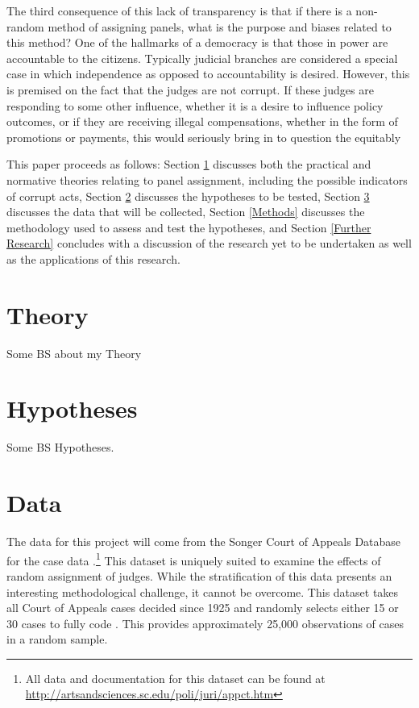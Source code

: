 \documentclass[12pt]{article}
\begin{document}
The third consequence of this lack of transparency is that if there is a non-random method of assigning panels, what is the purpose and biases related to this method?  One of the hallmarks of a democracy is that those in power are accountable to the citizens.  Typically judicial branches are considered a special case in which independence as opposed to accountability is desired.  However, this is premised on the fact that the judges are not corrupt.  If these judges are responding to some other influence, whether it is a desire to influence policy outcomes, or if they are receiving illegal compensations, whether in the form of promotions or payments, this would seriously bring in to question the equitably 

This paper proceeds as follows: Section \ref{Theory} discusses both the practical and normative theories relating to panel assignment, including the possible indicators of corrupt acts, Section \ref{Hypotheses} discusses the hypotheses to be tested, Section \ref{Data} discusses the data that will be collected, Section \ref{Methods} discusses the methodology used to assess and test the hypotheses, and Section \ref{Further Research} concludes with a discussion of the research yet to be undertaken as well as the applications of this research.

\section{Theory}\label{Theory}
Some BS about my Theory

\section{Hypotheses}\label{Hypotheses}
Some BS Hypotheses.

\section{Data}\label{Data}
The data for this project will come from the Songer Court of Appeals Database for the case data \citep{Songer2007}.\footnote{All data and documentation for this dataset can be found at \url{http://artsandsciences.sc.edu/poli/juri/appct.htm}}  This dataset is uniquely suited to examine the effects of random assignment of judges.  While the stratification of this data presents an interesting methodological challenge, it cannot be overcome.  This dataset takes all Court of Appeals cases decided since 1925 and randomly selects either 15 or 30 cases to fully code \citep{hurwitz2006institutional,hurtwitz2012changes}.  This provides approximately 25,000 observations of cases in a random sample.   
\end{document}
